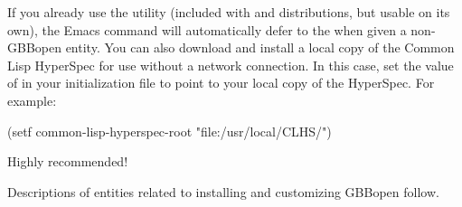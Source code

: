 \documentclass[10pt,twoside,english,pdftex]{article}
\begin{document}
If you already use the
utility (included with
 and
 distributions, but
usable on its own), the Emacs  command will
automatically defer to the  when given a
non-GBBopen entity.  You can also download and install a local copy of the
Common Lisp HyperSpec for use without a network connection.  In this case, set
the value of  in your 
initialization file to point to your local copy of the HyperSpec.  For
example:
%
\W\supp
\begin{example}
  (setf common-lisp-hyperspec-root "file:/usr/local/CLHS/")
\end{example}

Highly recommended!

\W\entities
\T{}
\T Descriptions of entities related to installing and customizing GBBopen follow.
\T\clearpage
\T\renewcommand{\headrulewidth}{0.01pt}

\end{document}
